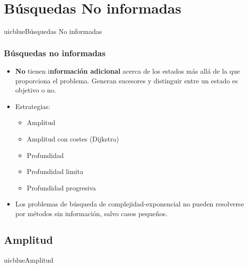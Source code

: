 \documentclass[xcolor=table]{beamer}
\begin{document}
\section{Búsquedas No informadas}
\begin{chapter}{uicblue}{Búsquedas No informadas}
\end{chapter}




\begin{frame} \frametitle{Búsquedas no informadas} \small
\begin{itemize}
\item \textbf{No} tienen i\textbf{nformación adicional} acerca de los estados más allá de la que proporciona el problema. 
Generan sucesores y distinguir entre un estado es objetivo o no.
\item Estrategias:
\begin{itemize}
\item Amplitud
\item Amplitud con costes (Dijkstra)
\item Profundidad
\item Profundidad limita
\item Profundidad progresiva
\end{itemize}

\item Los problemas de búsqueda de complejidad-exponencial no pueden resolverse por métodos sin información, salvo casos pequeños.

\end{itemize}


\end{frame} 


\subsection{Amplitud}
\begin{chapter}{uicblue}{Amplitud}
\end{chapter}
\end{document}
